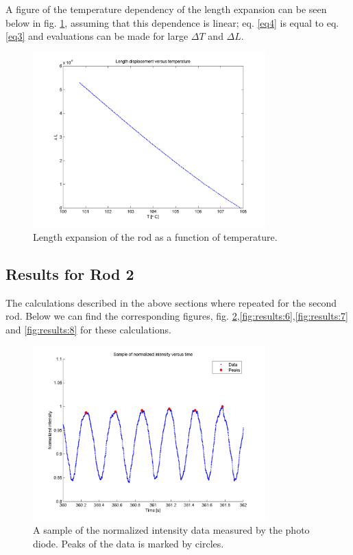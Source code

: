 A figure of the temperature dependency of the length expansion can be seen below in fig. \ref{fig:results:4}, assuming that this dependence is linear; eq. \eqref{eq4} is equal to eq. \eqref{eq3} and evaluations can be made for large $\Delta T$ and $ \Delta L$.

\begin{figure}[htb]
	\centering
	\includegraphics[width=0.8\textwidth]{img/dl_alu.png}
	\caption{Length expansion of the rod as a function of 		temperature.}
	\label{fig:results:4}
\end{figure}
\FloatBarrier

\subsection{Results for Rod 2}
The calculations described in the above sections where repeated for the second rod. Below we can find the corresponding figures, fig. \ref{fig:results:5},\ref{fig:results:6},\ref{fig:results:7} and \ref{fig:results:8} for these calculations.\\

\begin{figure}[htb]
	\centering
	\includegraphics[width=0.8\textwidth]{img/Peaks_tit.png}
	\caption{A sample of the normalized intensity data measured by the photo diode. Peaks of the data is marked by circles.}
	\label{fig:results:5}
\end{figure}

